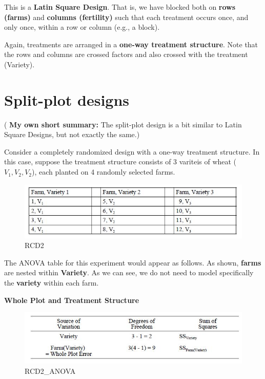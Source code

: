 \documentclass[]{book}
\begin{document}
This is a \textbf{Latin Square Design}. That is, we have blocked both on \textbf{rows (farms)} and \textbf{columns (fertility)} such that each treatment occurs once, and only once, within a row or column (e.g., a block).

Again, treatments are arranged in a \textbf{one-way treatment structure}. Note that the rows and columns are crossed factors and also crossed with the treatment (Variety).

\hypertarget{split-plot-designs}{%
\section{Split-plot designs}\label{split-plot-designs}}

( \textbf{My own short summary:} The split-plot design is a bit similar to Latin Square Designs, but not exactly the same.)

Consider a completely randomized design with a one-way treatment structure. In this case, suppose the treatment structure consists of 3 variteis of wheat (\(V_1,V_2,V_2\)), each planted on 4 randomly selected farms.

\begin{figure}
\centering
\includegraphics{RCD2.jpg}
\caption{RCD2}
\end{figure}

The ANOVA table for this experiment would appear as follows. As shown, \textbf{farms} are nested within \textbf{Variety}. As we can see, we do not need to model specifically the \textbf{variety} within each farm.

\textbf{Whole Plot and Treatment Structure}

\begin{figure}
\centering
\includegraphics{RCD2_ANOVA.jpg}
\caption{RCD2\_ANOVA}
\end{figure}
\end{document}
